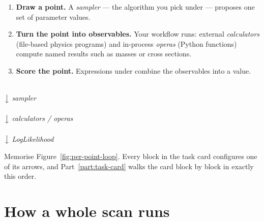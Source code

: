 \begin{enumerate}
  \item \textbf{Draw a point.} A \emph{sampler} --- the algorithm you pick under
         --- proposes one set of parameter values.
  \item \textbf{Turn the point into observables.} Your workflow runs: external
        \emph{calculators} (file-based physics programs) and
        in-process \emph{operas} (Python functions) compute named results such as
        masses or cross sections.
  \item \textbf{Score the point.} Expressions under 
        combine the observables into a  value.
\end{enumerate}

\begin{marginfigure}
\centering
{}\\[2pt]
$\big\downarrow$ \emph{sampler}\\[2pt]
\\[2pt]
$\big\downarrow$ \emph{calculators / operas}\\[2pt]
\\[2pt]
$\big\downarrow$ \emph{LogLikelihood}\\[2pt]
\caption[The per-point loop.]{The per-point loop. Every task card fills in these three
arrows --- notice how each maps to one card block.}
\label{fig:per-point-loop}
\end{marginfigure}

Memorise Figure~\ref{fig:per-point-loop}. Every block in the task card configures one
of its arrows, and Part~\ref{part:task-card} walks the card block by block in exactly
this order.

\section{How a whole scan runs}
\label{sec:runtime-picture}

